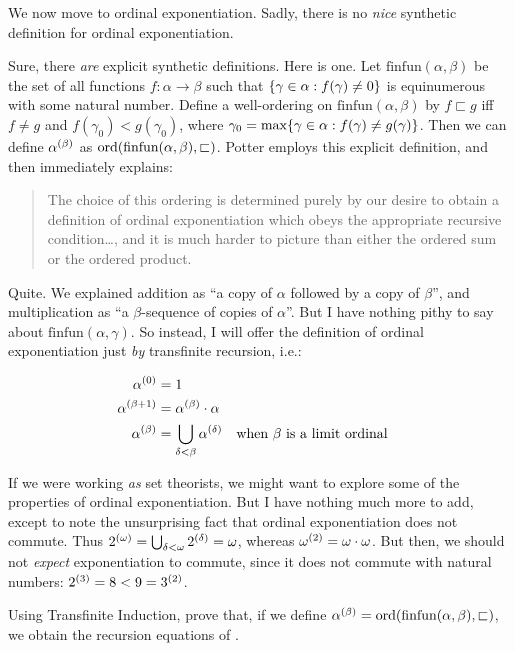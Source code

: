 \documentclass[../../../include/open-logic-section]{subfiles}
\begin{document}

We now move to ordinal exponentiation. Sadly, there is no \emph{nice}
synthetic definition for ordinal exponentiation.

Sure, there \emph{are} explicit synthetic definitions. Here is one.
Let $\text{finfun}(\alpha,\beta)$ be the set of all functions $f
\colon \alpha \to \beta$ such that $\{ \gamma \in
\alpha : f(\gamma) \neq 0 \}$ is equinumerous with some natural number.
Define a well-ordering on $\text{finfun}(\alpha,\beta)$ by $f
\sqsubset g$ iff $f \neq g$ and $f(\gamma_0) < g(\gamma_0)$, where
$\gamma_0 = \text{max}\{ \gamma \in \alpha : f(\gamma) \neq
g(\gamma) \}$. Then we can define $\alpha^{(\beta)}$ as
$\mathrm{ord}(\text{finfun}(\alpha, \beta), \sqsubset)$. Potter employs
this explicit definition, and then immediately explains:
\begin{quote}
	The choice of this ordering is determined purely by our desire to
	obtain a definition of ordinal exponentiation which obeys the
	appropriate recursive condition\ldots, and it is much harder to
	picture than either the ordered sum or the ordered product.
	\citep[p.~199]{Potter2004}
\end{quote}
Quite. We explained addition as ``a copy of $\alpha$ followed by a
copy of $\beta$'', and multiplication as ``a $\beta$-sequence of
copies of $\alpha$''. But I have nothing pithy to say about
$\text{finfun}(\alpha, \gamma)$. So instead, I will offer the
definition of ordinal exponentiation just \emph{by} transfinite
recursion, i.e.:

\begin{defn}
\begin{align*}
	\ordexpo{\alpha}{0} &= 1\\
	\ordexpo{\alpha}{\beta\ordplus 1} &=\ordexpo{\alpha}{\beta} \ordtimes \alpha\\
	\ordexpo{\alpha}{\beta} &= \bigcup_{\delta < \beta}\ordexpo{\alpha}{\delta}& & \text{when $\beta$ is a limit ordinal}
\end{align*}
\end{defn}

If we were working \emph{as} set theorists, we might want to explore
some of the properties of ordinal exponentiation. But I have nothing
much more to add, except to note the unsurprising fact that ordinal
exponentiation does not commute. Thus $2^{(\omega)} =
\bigcup_{\delta < \omega}2^{(\delta)} = \omega$, whereas
$\omega^{(2)} = \omega \cdot \omega$. But then, we should
not \emph{expect} exponentiation to commute, since it does not commute
with natural numbers: $2^{(3)} = 8 < 9 = 3^{(2)}$. 

\begin{prob}
Using Transfinite Induction, prove that, if we define
$\alpha^{(\beta)} = \mathrm{ord}(\text{finfun}(\alpha, \beta),
\sqsubset)$, we obtain the recursion equations of
.
\end{prob}
\end{document}
